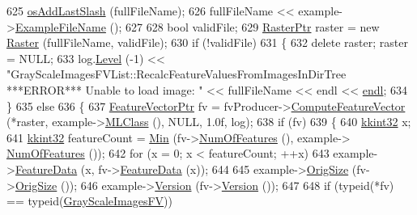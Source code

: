 \begin{DoxyCode}
625     \hyperlink{namespace_k_k_b_a60e413a66cd7d3a5679d2844dd5e3d97}{osAddLastSlash} (fullFileName);
626     fullFileName << example->\hyperlink{class_k_k_m_l_l_1_1_feature_vector_ab47c89ab1e9396664fdc0dc34b6e1ab5}{ExampleFileName} ();
627 
628     \textcolor{keywordtype}{bool}   validFile;
629     \hyperlink{class_k_k_b_1_1_raster}{RasterPtr}  raster = \textcolor{keyword}{new} \hyperlink{class_k_k_b_1_1_raster}{Raster} (fullFileName, validFile);
630     \textcolor{keywordflow}{if}  (!validFile)
631     \{
632       \textcolor{keyword}{delete}  raster;  raster = NULL;
633       log.\hyperlink{class_k_k_b_1_1_run_log_a32cf761d7f2e747465fd80533fdbb659}{Level} (-1) << \textcolor{stringliteral}{"GrayScaleImagesFVList::RecalcFeatureValuesFromImagesInDirTree   ***ERROR*** 
       Unable to load image: "} << fullFileName << endl << \hyperlink{namespace_k_k_b_ad1f50f65af6adc8fa9e6f62d007818a8}{endl};
634     \}
635     \textcolor{keywordflow}{else}
636     \{
637       \hyperlink{class_k_k_m_l_l_1_1_feature_vector}{FeatureVectorPtr} fv = fvProducer->\hyperlink{class_k_k_m_l_l_1_1_feature_vector_producer_a8f93296a46432624867b12ed8631df0f}{ComputeFeatureVector} (*raster, 
      example->\hyperlink{class_k_k_m_l_l_1_1_feature_vector_a3c8fe002c6e868f8c00059c004fb32fd}{MLClass} (), NULL, 1.0f, log);
638       \textcolor{keywordflow}{if}  (fv)
639       \{
640         \hyperlink{namespace_k_k_b_a8fa4952cc84fda1de4bec1fbdd8d5b1b}{kkint32}  x;
641         \hyperlink{namespace_k_k_b_a8fa4952cc84fda1de4bec1fbdd8d5b1b}{kkint32}  featureCount = \hyperlink{_raster_8cpp_a6261a282d8ed27242c636ad5fb658585}{Min} (fv->\hyperlink{class_k_k_m_l_l_1_1_feature_vector_a660d9573e5ac78e9c3e09d68cddae7d6}{NumOfFeatures} (), example->
      \hyperlink{class_k_k_m_l_l_1_1_feature_vector_a660d9573e5ac78e9c3e09d68cddae7d6}{NumOfFeatures} ());
642         \textcolor{keywordflow}{for} (x = 0; x < featureCount;  ++x)
643           example->\hyperlink{class_k_k_m_l_l_1_1_feature_vector_af055b7c725a4d80a31cd2f6606cc37b6}{FeatureData} (x, fv->\hyperlink{class_k_k_m_l_l_1_1_feature_vector_af055b7c725a4d80a31cd2f6606cc37b6}{FeatureData} (x));
644 
645         example->\hyperlink{class_k_k_m_l_l_1_1_feature_vector_a5ea23a16266bc34a289824042a836c06}{OrigSize} (fv->\hyperlink{class_k_k_m_l_l_1_1_feature_vector_a5ea23a16266bc34a289824042a836c06}{OrigSize} ());
646         example->\hyperlink{class_k_k_m_l_l_1_1_feature_vector_a17650be71b83695d35d34029257652ea}{Version} (fv->\hyperlink{class_k_k_m_l_l_1_1_feature_vector_a17650be71b83695d35d34029257652ea}{Version} ());
647 
648         \textcolor{keywordflow}{if}  (\textcolor{keyword}{typeid}(*fv) == \textcolor{keyword}{typeid}(\hyperlink{class_k_k_m_l_l_1_1_gray_scale_images_f_v}{GrayScaleImagesFV}))

\end{DoxyCode}
